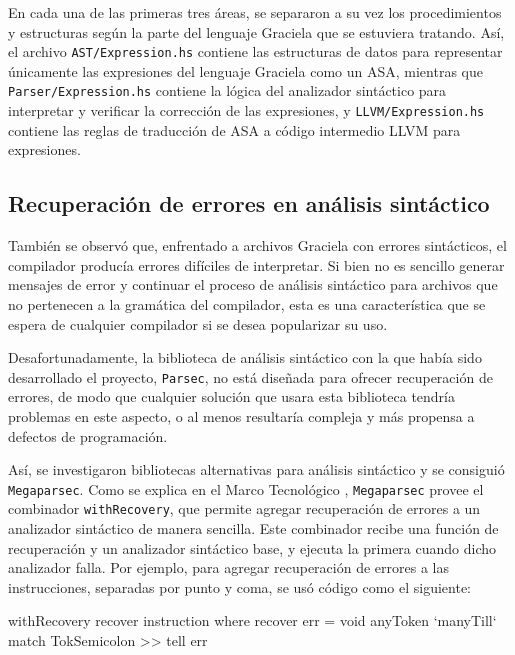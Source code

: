 En cada una de las primeras tres áreas, se separaron a su vez los procedimientos
y estructuras según la parte del lenguaje Graciela que se estuviera tratando.
Así, el archivo \texttt{AST/Expression.hs} contiene las estructuras de datos
para representar únicamente las expresiones del lenguaje Graciela como un
\textsc{ASA}, mientras que \texttt{Parser/Expression.hs} contiene la lógica del
analizador sintáctico para interpretar y verificar la corrección de las
expresiones, y \texttt{LLVM/Expression.hs} contiene las reglas de traducción de
\textsc{ASA} a código intermedio \textsc{LLVM} para expresiones.

\subsection{Recuperación de errores en análisis sintáctico}

También se observó que, enfrentado a archivos Graciela con errores sintácticos,
el compilador producía errores difíciles de interpretar. Si bien no es sencillo
generar mensajes de error y continuar el proceso de análisis sintáctico para
archivos que no pertenecen a la gramática del compilador, esta es una
característica que se espera de cualquier compilador si se desea popularizar su
uso.

Desafortunadamente, la biblioteca de análisis sintáctico con la que había sido
desarrollado el proyecto, \texttt{Parsec}, no está diseñada para ofrecer
recuperación de errores, de modo que cualquier solución que usara esta
biblioteca tendría problemas en este aspecto, o al menos resultaría compleja y
más propensa a defectos de programación.

Así, se investigaron bibliotecas alternativas para análisis sintáctico y se
consiguió \texttt{Megaparsec}. Como se explica en el Marco Tecnológico
, \texttt{Megaparsec} provee el
combinador \texttt{withRecovery}, que permite agregar recuperación de errores a
un analizador sintáctico de manera sencilla. Este combinador recibe una función
de recuperación y un analizador sintáctico base, y ejecuta la primera cuando
dicho analizador falla. Por ejemplo, para agregar recuperación de errores a las
instrucciones, separadas por punto y coma, se usó código como el siguiente:

\begin{haskellcode}
withRecovery recover instruction
  where
    recover err = void anyToken `manyTill` match TokSemicolon >> tell err
\end{haskellcode}

